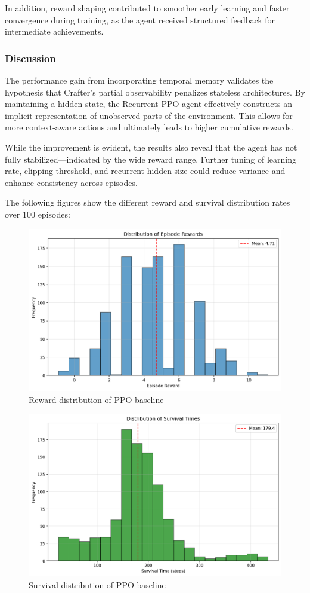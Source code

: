\documentclass[twocolumn]{article}
\begin{document}
In addition, reward shaping contributed to smoother early learning and faster convergence during training, as the agent received structured feedback for intermediate achievements.

\subsubsection*{Discussion}

The performance gain from incorporating temporal memory validates the hypothesis that Crafter's partial observability penalizes stateless architectures. By maintaining a hidden state, the Recurrent PPO agent effectively constructs an implicit representation of unobserved parts of the environment. This allows for more context-aware actions and ultimately leads to higher cumulative rewards. 

While the improvement is evident, the results also reveal that the agent has not fully stabilized—indicated by the wide reward range. Further tuning of learning rate, clipping threshold, and recurrent hidden size could reduce variance and enhance consistency across episodes.

The following figures show the different reward and survival distribution rates over 100 episodes:

\begin{figure}[H]
    \centering
    \includegraphics[width=0.75\linewidth]{images/reward_distribution_ppo_improv2_1000_episodes.png}
    \caption{Reward distribution of PPO baseline}
    \label{fig:placeholder}
\end{figure}
\begin{figure}[H]
    \centering
    \includegraphics[width=0.75\linewidth]{images/survival_distribution_ppo_improv2_1000_episodes.png}
    \caption{Survival distribution of PPO baseline}
    \label{fig:placeholder}
\end{figure}
\end{document}
